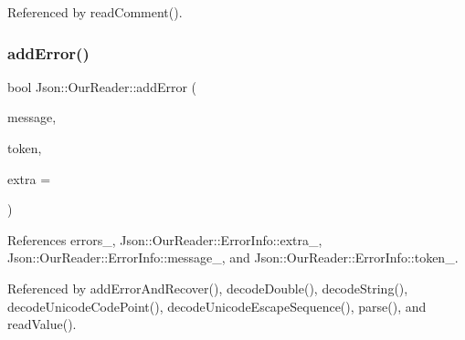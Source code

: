 Referenced by read\+Comment().

\mbox{\label{classJson_1_1OurReader_aa6a920311e6408ff3a45324d49da18a6_aa6a920311e6408ff3a45324d49da18a6}} 
\subsubsection{\texorpdfstring{add\+Error()}{addError()}}
{\footnotesize\ttfamily bool Json\+::\+Our\+Reader\+::add\+Error (\begin{DoxyParamCaption}\item[{const \hyperlink{json_8h_a1e723f95759de062585bc4a8fd3fa4be_a1e723f95759de062585bc4a8fd3fa4be}{J\+S\+O\+N\+C\+P\+P\+\_\+\+S\+T\+R\+I\+NG} \&}]{message,  }\item[{\hyperlink{classJson_1_1OurReader_1_1Token}{Token} \&}]{token,  }\item[{\hyperlink{classJson_1_1OurReader_a1bdc7bbc52ba87cae6b19746f2ee0189_a1bdc7bbc52ba87cae6b19746f2ee0189}{Location}}]{extra = {} }\end{DoxyParamCaption})\hspace{0.3cm}{\ttfamily [private]}}



References errors\+\_\+, Json\+::\+Our\+Reader\+::\+Error\+Info\+::extra\+\_\+, Json\+::\+Our\+Reader\+::\+Error\+Info\+::message\+\_\+, and Json\+::\+Our\+Reader\+::\+Error\+Info\+::token\+\_\+.



Referenced by add\+Error\+And\+Recover(), decode\+Double(), decode\+String(), decode\+Unicode\+Code\+Point(), decode\+Unicode\+Escape\+Sequence(), parse(), and read\+Value().

\mbox{\label{classJson_1_1OurReader_a074cf3d91e9404fe89e03cfc6a43e6fb_a074cf3d91e9404fe89e03cfc6a43e6fb}} 
